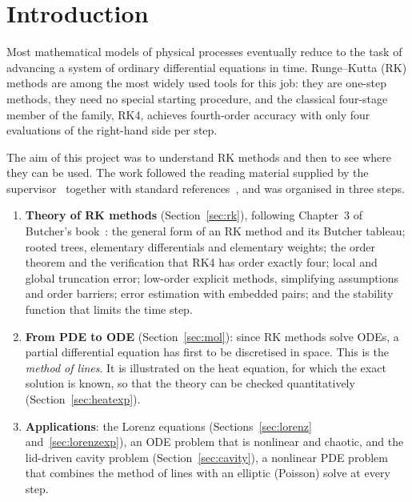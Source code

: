 \documentclass[11pt,a4paper]{article}
\begin{document}
\tableofcontents
\newpage

\section{Introduction}

Most mathematical models of physical processes eventually reduce to the task of advancing a system of
ordinary differential equations in time. Runge--Kutta (RK) methods are among the most widely used tools
for this job: they are one-step methods, they need no special starting procedure, and the classical
four-stage member of the family, RK4, achieves fourth-order accuracy with only four evaluations of the
right-hand side per step.

The aim of this project was to understand RK methods and then to see where they can be used. The work
followed the reading material supplied by the supervisor~\cite{ghorai} together with standard
references~\cite{butcher2008,hairer1993}, and was organised in three steps.

\begin{enumerate}[leftmargin=*]
\item \textbf{Theory of RK methods} (Section~\ref{sec:rk}), following Chapter~3 of Butcher's
book~\cite{butcher2008}: the general form of an RK method and its Butcher tableau; rooted trees,
elementary differentials and elementary weights; the order theorem and the verification that RK4 has order
exactly four; local and global truncation error; low-order explicit methods, simplifying assumptions and
order barriers; error estimation with embedded pairs; and the stability function that limits the time step.
\item \textbf{From PDE to ODE} (Section~\ref{sec:mol}): since RK methods solve ODEs, a partial
differential equation has first to be discretised in space. This is the \emph{method of lines}. It is
illustrated on the heat equation, for which the exact solution is known, so that the theory can be
checked quantitatively (Section~\ref{sec:heatexp}).
\item \textbf{Applications}: the Lorenz equations (Sections~\ref{sec:lorenz} and~\ref{sec:lorenzexp}), an
ODE problem that is nonlinear and chaotic, and the lid-driven cavity problem (Section~\ref{sec:cavity}),
a nonlinear PDE problem that combines the method of lines with an elliptic (Poisson) solve at every step.
\end{enumerate}
\end{document}
